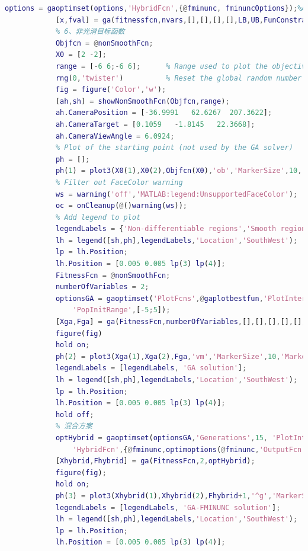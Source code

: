 \begin{lstlisting}[language = Matlab]
            options = gaoptimset(options,'HybridFcn',{@fminunc, fminuncOptions});%Adding a Hybrid Function
            [x,fval] = ga(fitnessfcn,nvars,[],[],[],[],LB,UB,FunConstraint,[],options)
            % 6、非光滑目标函数
            Objfcn = @nonSmoothFcn;
            X0 = [2 -2];
            range = [-6 6;-6 6];      % Range used to plot the objective function
            rng(0,'twister')          % Reset the global random number generator
            fig = figure('Color','w');
            [ah,sh] = showNonSmoothFcn(Objfcn,range);
            ah.CameraPosition = [-36.9991   62.6267  207.3622];
            ah.CameraTarget = [0.1059   -1.8145   22.3668];
            ah.CameraViewAngle = 6.0924;
            % Plot of the starting point (not used by the GA solver)
            ph = [];
            ph(1) = plot3(X0(1),X0(2),Objfcn(X0),'ob','MarkerSize',10,'MarkerFaceColor','b');
            % Filter out FaceColor warning
            ws = warning('off','MATLAB:legend:UnsupportedFaceColor');
            oc = onCleanup(@()warning(ws));
            % Add legend to plot
            legendLabels = {'Non-differentiable regions','Smooth regions','Start point'};
            lh = legend([sh,ph],legendLabels,'Location','SouthWest');
            lp = lh.Position;
            lh.Position = [0.005 0.005 lp(3) lp(4)];
            FitnessFcn = @nonSmoothFcn;
            numberOfVariables = 2;
            optionsGA = gaoptimset('PlotFcns',@gaplotbestfun,'PlotInterval',5, ...
                'PopInitRange',[-5;5]);
            [Xga,Fga] = ga(FitnessFcn,numberOfVariables,[],[],[],[],[],[],[],[],optionsGA)
            figure(fig)
            hold on;
            ph(2) = plot3(Xga(1),Xga(2),Fga,'vm','MarkerSize',10,'MarkerFaceColor','m');
            legendLabels = [legendLabels, 'GA solution'];
            lh = legend([sh,ph],legendLabels,'Location','SouthWest');
            lp = lh.Position;
            lh.Position = [0.005 0.005 lp(3) lp(4)];
            hold off;
            % 混合方案
            optHybrid = gaoptimset(optionsGA,'Generations',15, 'PlotInterval',1,...
                'HybridFcn',{@fminunc,optimoptions(@fminunc,'OutputFcn',@fminuncOut)});
            [Xhybrid,Fhybrid] = ga(FitnessFcn,2,optHybrid);
            figure(fig);
            hold on;
            ph(3) = plot3(Xhybrid(1),Xhybrid(2),Fhybrid+1,'^g','MarkerSize',10,'MarkerFaceColor','g');
            legendLabels = [legendLabels, 'GA-FMINUNC solution'];
            lh = legend([sh,ph],legendLabels,'Location','SouthWest');
            lp = lh.Position;
            lh.Position = [0.005 0.005 lp(3) lp(4)];

\end{lstlisting}

